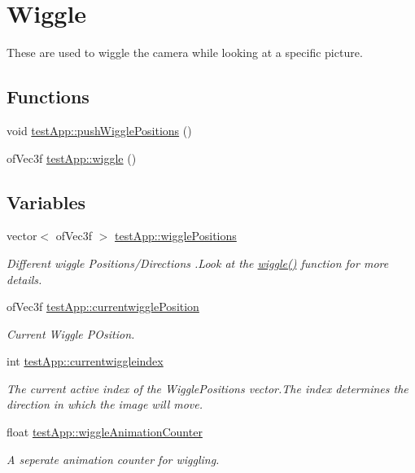 \hypertarget{group___wiggle}{\section{Wiggle}
\label{group___wiggle}
}


These are used to wiggle the camera while looking at a specific picture.  


\subsection*{Functions}
\begin{DoxyCompactItemize}
\item 
void \hyperlink{group___wiggle_gaaa5c2175be1d5ca404c3c23a898d0cdd}{test\-App\-::push\-Wiggle\-Positions} ()
\item 
of\-Vec3f \hyperlink{group___wiggle_gacd718eb54b9dc2b45e463414c24de6b9}{test\-App\-::wiggle} ()
\end{DoxyCompactItemize}
\subsection*{Variables}
\begin{DoxyCompactItemize}
\item 
vector$<$ of\-Vec3f $>$ \hyperlink{group___wiggle_ga5495d37f44bb3e3b00a04ad5910e0a6b}{test\-App\-::wiggle\-Positions}
\begin{DoxyCompactList}\small\item\em Different wiggle Positions/\-Directions .Look at the \hyperlink{group___wiggle_gacd718eb54b9dc2b45e463414c24de6b9}{wiggle()} function for more details. \end{DoxyCompactList}\item 
of\-Vec3f \hyperlink{group___wiggle_gaf81358868ae15faab1974ec074b1509f}{test\-App\-::currentwiggle\-Position}
\begin{DoxyCompactList}\small\item\em Current Wiggle P\-Osition. \end{DoxyCompactList}\item 
int \hyperlink{group___wiggle_ga6b9af0b1ae4a2c0530eb6a8cf8340751}{test\-App\-::currentwiggleindex}
\begin{DoxyCompactList}\small\item\em The current active index of the Wiggle\-Positions vector.\-The index determines the direction in which the image will move. \end{DoxyCompactList}\item 
float \hyperlink{group___wiggle_ga6073b33be7847d675ec089a1d514c506}{test\-App\-::wiggle\-Animation\-Counter}
\begin{DoxyCompactList}\small\item\em A seperate animation counter for wiggling. \end{DoxyCompactList}\end{DoxyCompactItemize}


